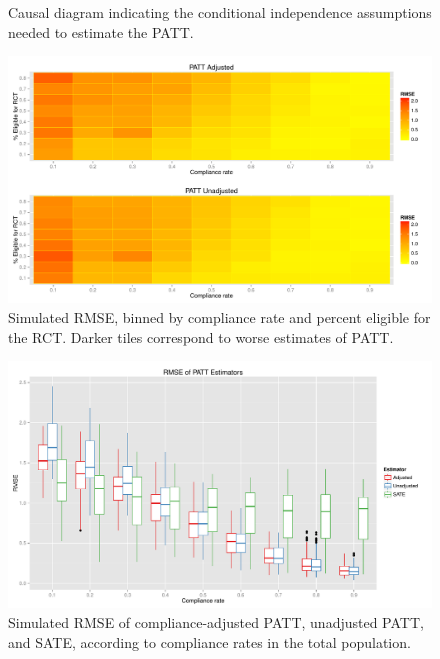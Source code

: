 \documentclass[12pt]{article}
\begin{document}
\pagebreak
\begin{appendices}

\begin{figure}[htb]
\centering
{}
\caption{Causal diagram indicating the conditional independence assumptions needed to estimate the PATT.}\label{fig:DAG}
\end{figure}

\begin{figure}[htbp]
\begin{center}
\includegraphics[width = 1\textwidth]{rmse_ratec_rates}
\caption{Simulated RMSE, binned by compliance rate and percent eligible for the RCT. Darker tiles correspond to worse estimates of PATT.}
\label{fig:sim_tiles}
\end{center}
\end{figure}

\begin{figure}[htbp]
\begin{center}
\includegraphics[width = 1\textwidth]{rmse_boxplots}
\caption{Simulated RMSE of compliance-adjusted PATT, unadjusted PATT, and SATE, according to compliance rates in the total population.}
\label{fig:sim_compliance}
\end{center}
\end{figure}


\end{appendices}
\end{document}
